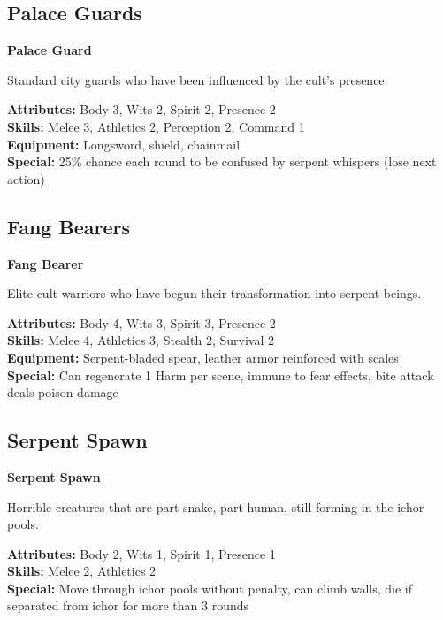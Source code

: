\documentclass[12pt,twoside]{article}
\newenvironment{npcbox}[1]{
  \begin{mdframed}[
    linewidth=1pt,
    linecolor=dungeongray,
    backgroundcolor=white,
    innertopmargin=5pt,
    innerbottommargin=5pt,
    innerrightmargin=5pt,
    innerleftmargin=5pt
  ]
  \textbf{#1}
}{\end{mdframed}}
\begin{document}
\subsection{Palace Guards}

\begin{npcbox}{Palace Guard}
Standard city guards who have been influenced by the cult's presence.

\textbf{Attributes:} Body 3, Wits 2, Spirit 2, Presence 2 \\
\textbf{Skills:} Melee 3, Athletics 2, Perception 2, Command 1 \\
\textbf{Equipment:} Longsword, shield, chainmail \\
\textbf{Special:} 25\% chance each round to be confused by serpent whispers (lose next action)
\end{npcbox}

\subsection{Fang Bearers}

\begin{npcbox}{Fang Bearer}
Elite cult warriors who have begun their transformation into serpent beings.

\textbf{Attributes:} Body 4, Wits 3, Spirit 3, Presence 2 \\
\textbf{Skills:} Melee 4, Athletics 3, Stealth 2, Survival 2 \\
\textbf{Equipment:} Serpent-bladed spear, leather armor reinforced with scales \\
\textbf{Special:} Can regenerate 1 Harm per scene, immune to fear effects, bite attack deals poison damage
\end{npcbox}

\subsection{Serpent Spawn}

\begin{npcbox}{Serpent Spawn}
Horrible creatures that are part snake, part human, still forming in the ichor pools.

\textbf{Attributes:} Body 2, Wits 1, Spirit 1, Presence 1 \\
\textbf{Skills:} Melee 2, Athletics 2 \\
\textbf{Special:} Move through ichor pools without penalty, can climb walls, die if separated from ichor for more than 3 rounds
\end{npcbox}
\end{document}
